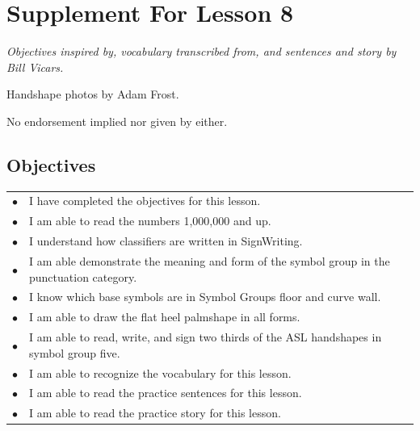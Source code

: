 \documentclass{article}
\begin{document}
\newfontfamily{}
\newfontfamily{}
\newcommand{\bul}{\hfil$\bullet$&}
\renewenvironment{glossary}{\begin{multicols}{5}\begin{center}}{\end{center}\end{multicols}}
\setcounter{secnumdepth}{0}
\setlength{\columnseprule}{1pt}

\section{Supplement For Lesson 8}

\begin{center}
\it
Objectives inspired by, vocabulary transcribed from, and sentences and story by Bill Vicars.

Handshape photos by Adam Frost.

No endorsement implied nor given by either.
\end{center}

\subsection{Objectives}

\begin{tabular}{p{1cm}p{14cm}}
\bul I have completed the objectives for this lesson.\\
\bul I am able to read the numbers 1,000,000 and up.\\
\bul I understand how classifiers are written in SignWriting.\\
\bul I am able demonstrate the meaning and form of the symbol group in the punctuation category.\\
\bul I know which base symbols are in Symbol Groups floor and curve wall.\\
\bul I am able to draw the flat heel palmshape in all forms.\\
\bul I am able to read, write, and sign two thirds of the ASL handshapes in symbol group five.\\
\bul I am able to recognize the vocabulary for this lesson.\\
\bul I am able to read the practice sentences for this lesson.\\
\bul I am able to read the practice story for this lesson.\\
\end{tabular}
\end{document}
